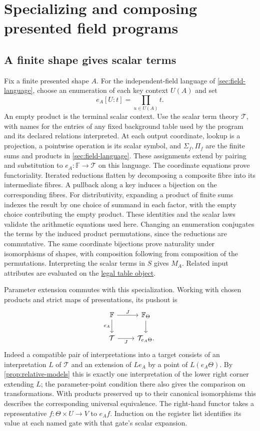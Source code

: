 \documentclass[11pt,a4paper]{article}
\theoremstyle{definition}
\theoremstyle{remark}\newaliascnt{remark}{theorem}
\numberwithin{equation}{section}
\begin{document}
\section{Specializing and composing presented field programs}\label{app:field-presentations}

\subsection{A finite shape gives scalar terms}
Fix a finite presented shape \(A\). For the independent-field language of \cref{sec:field-language}, choose an enumeration of each key context \(U(A)\) and set
\[
 e_A[U:t]=\prod_{u\in U(A)}t .
\]
An empty product is the terminal scalar context. Use the scalar term theory \(\mathcal T\), with names for the entries of any fixed background table used by the program and its declared relations interpreted. At each output coordinate, lookup is a projection, a pointwise operation is its scalar symbol, and \(\Sigma_f,\Pi_f\) are the finite sums and products in \cref{sec:field-language}. These assignments extend by pairing and substitution to \(e_A:\mathbb F\to\mathcal T\) on this language. The coordinate equations prove functoriality. Iterated reductions flatten by decomposing a composite fibre into its intermediate fibres. A pullback along a key induces a bijection on the corresponding fibres. For distributivity, expanding a product of finite sums indexes the result by one choice of summand in each factor, with the empty choice contributing the empty product. These identities and the scalar laws validate the arithmetic equations used here. Changing an enumeration conjugates the terms by the induced product permutations, since the reductions are commutative. The same coordinate bijections prove naturality under isomorphisms of shapes, with composition following from composition of the permutations. Interpreting the scalar terms in \(S\) gives \(M_A\). Related input attributes are evaluated on the \hyperref[sec:legal-attribute-tables]{legal table object}.

Parameter extension commutes with this specialization. Working with chosen products and strict maps of presentations, its pushout is
\[
\begin{tikzcd}
 \mathbb F\arrow[r,"J"]\arrow[d,"e_A"']&
       \mathbb F_\Theta\arrow[d]\\
 \mathcal T\arrow[r,"J"']&\mathcal T_{e_A\Theta}.
\end{tikzcd}
\]
Indeed a compatible pair of interpretations into a target consists of an interpretation \(L\) of \(\mathcal T\) and an extension of \(Le_A\) by a point of \(L(e_A\Theta)\). By \cref{prop:relative-models} this is exactly one interpretation of the lower right corner extending \(L\); the parameter-point condition there also gives the comparison on transformations. With products preserved up to their canonical isomorphisms this describes the corresponding universal equivalence. The right-hand functor takes a representative \(f:\Theta\times U\to V\) to \(e_A f\). Induction on the register list identifies its value at each named gate with that gate's scalar expansion.
\end{document}

